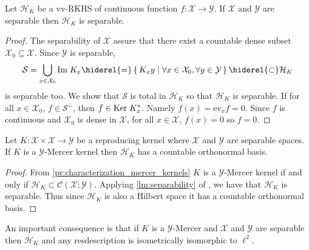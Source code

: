 \begin{lemma}
\label{lm:separability}
Let $\mathcal{H}_K$ be a \acl{vv-RKHS} of continuous function $f:\mathcal{X}\to\mathcal{Y}$. If $\mathcal{X}$ and $\mathcal{Y}$ are separable then $\mathcal{H}_K$ is separable.
\end{lemma}
\begin{proof}
The separability of $\mathcal{X}$ assure that there exist a countable dense subset $\mathcal{X}_0\subseteq\mathcal{X}$. Since $\mathcal{Y}$ is separable,
\begin{dmath*}
\mathcal{S}=\bigcup_{x\in\mathcal{X}_0}\Ima K_x \hiderel{=}\set{K_xy|\forall x\in\mathcal{X}_0, \forall y\in\mathcal{Y}}\hiderel{\subset} \mathcal{H}_K
\end{dmath*}
is separable too. We show that $\mathcal{S}$ is total in $\mathcal{H}_K$ so that $\mathcal{H}_K$ is separable. If for all $x\in\mathcal{X}_0$, $f\in\mathcal{S}^{\perp}$, then $f\in\text{Ker}\; K_x^*$. Namely $f(x)=\text{ev}_xf=0$. Since $f$ is continuous and $\mathcal{X}_0$ is dense in $\mathcal{X}$, for all $x\in\mathcal{X}$, $f(x)=0$ so $f=0$.
\end{proof}

\begin{proposition}
\label{pr:mercer_countable_basis}
Let $K:\mathcal{X}\times\mathcal{X}\to\mathcal{Y}$ be a reproducing kernel where $\mathcal{X}$ and $\mathcal{Y}$ are separable spaces. If $K$ is a $\mathcal{Y}$-Mercer kernel then $\mathcal{H}_K$ has a countable orthonormal basis.
\end{proposition}
\begin{proof}
From \cref{pr:characterization_mercer_kernels} $K$ is a $\mathcal{Y}$-Mercer kernel if and only if $\mathcal{H}_K\subset \mathcal{C}(\mathcal{X};\mathcal{Y})$. Applying \cref{lm:separability} of \cite{carmeli2006vector}, we have that $\mathcal{H}_K$ is separable. Thus since $\mathcal{H}_K$ is also a Hilbert space it has a countable orthonormal basis.
\end{proof}
An important consequence is that if $K$ is a $\mathcal{Y}$-Mercer and $\mathcal{X}$ and $\mathcal{Y}$ are separable then $\mathcal{H}_K$ and any resdescription is isometrically isomorphic to $\ell^2$.

